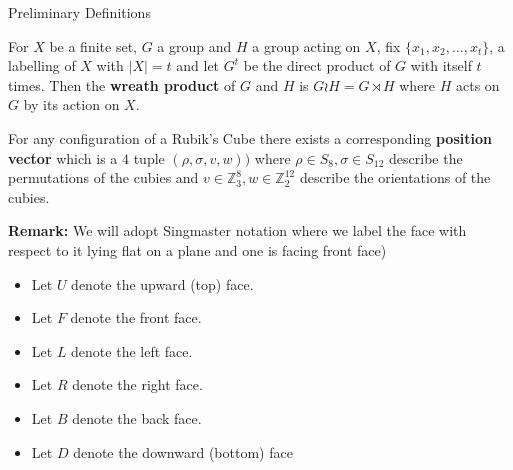 \documentclass[final]{beamer}
\newlength{\colwidth}
\begin{document}
\begin{frame}[t]
\begin{columns}[t]
\begin{column}{\colwidth}
\begin{alertblock}{Preliminary Definitions}

For $X$ be a finite set, $G$ a group and $H$ a group acting on $X$,
fix $\{x_1,x_2, \dots, x_t\}$, a labelling of $X$ with $| X | = t$ and 
let $G^t$ be the direct product of $G$ with itself $t$ times.
Then the \textbf{wreath product} of $G$ and $H$ is $G \wr H = G \rtimes H$ where $H$ acts on $G$ by its action on $X$.





    

For any configuration of a Rubik's Cube there exists a corresponding \textbf{position vector} which is a $4$ tuple $(\rho, \sigma, v, w))$ where $\rho \in S_8, \sigma \in S_{12}$ describe the permutations of the cubies and $v \in \mathbb Z_3^8, w \in \mathbb Z_2^{12}$ describe the orientations of the cubies.

\textbf{Remark:} 
We will adopt Singmaster notation where  
we label the face with respect to it lying
flat on a plane and one is facing front face)

\begin{itemize}
\item Let $U$ denote the upward (top) face.
\item Let $F$ denote the front face.
\item Let $L$ denote the left face.
\item Let $R$ denote the right face.
\item Let $B$ denote the back face.
\item Let $D$ denote the downward (bottom) face
\end{itemize}


\end{alertblock}
\end{column}
\end{columns}
\end{frame}
\end{document}
